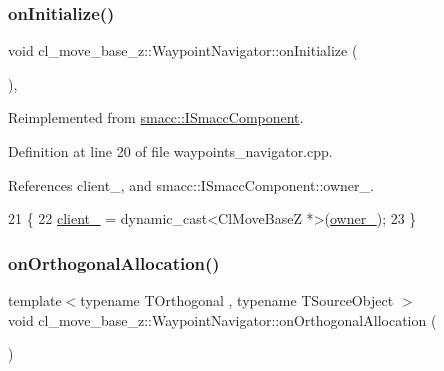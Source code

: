 \subsubsection{\texorpdfstring{on\+Initialize()}{onInitialize()}}
{\footnotesize\ttfamily void cl\+\_\+move\+\_\+base\+\_\+z\+::\+Waypoint\+Navigator\+::on\+Initialize (\begin{DoxyParamCaption}{ }\end{DoxyParamCaption})\hspace{0.3cm}{\ttfamily [override]}, {\ttfamily [virtual]}}



Reimplemented from \hyperlink{classsmacc_1_1ISmaccComponent_ae6f71d008db12553912e9436184b9e65}{smacc\+::\+I\+Smacc\+Component}.



Definition at line 20 of file waypoints\+\_\+navigator.\+cpp.



References client\+\_\+, and smacc\+::\+I\+Smacc\+Component\+::owner\+\_\+.


\begin{DoxyCode}
21 \{
22   \hyperlink{classcl__move__base__z_1_1WaypointNavigator_afc5ad5c5d15f41437286b8fca1d3a324}{client\_} = \textcolor{keyword}{dynamic\_cast<}ClMoveBaseZ *\textcolor{keyword}{>}(\hyperlink{classsmacc_1_1ISmaccComponent_a909590e672450ce0eb0d8facb45c737a}{owner\_});
23 \}
\end{DoxyCode}
\mbox{\label{classcl__move__base__z_1_1WaypointNavigator_aa41d28f71eccc3a61932d09f8ea8f5f5}} 
\subsubsection{\texorpdfstring{on\+Orthogonal\+Allocation()}{onOrthogonalAllocation()}}
{\footnotesize\ttfamily template$<$typename T\+Orthogonal , typename T\+Source\+Object $>$ \\
void cl\+\_\+move\+\_\+base\+\_\+z\+::\+Waypoint\+Navigator\+::on\+Orthogonal\+Allocation (\begin{DoxyParamCaption}{ }\end{DoxyParamCaption})\hspace{0.3cm}{\ttfamily [inline]}}



